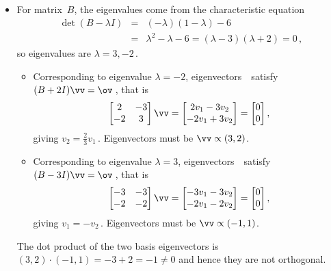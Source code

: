\begin{example}
\begin{solution}
\begin{itemize}
\item For matrix~\(B\), the eigenvalues come from the characteristic equation
\begin{eqnarray*}
\det(B-\lambda I)&=&(-\lambda)(1-\lambda)-6
\\&=&\lambda^2-\lambda-6
=(\lambda-3)(\lambda+2)=0\,,
\end{eqnarray*}
so eigenvalues are \(\lambda=3,-2\)\,.
\begin{itemize}
\item Corresponding to eigenvalue \(\lambda=-2\), eigenvectors~\vv\ satisfy \((B+2I)\vv=\ov\)\,, that is
\begin{equation*}
\begin{bmatrix} 2&-3\\-2&3 \end{bmatrix}\vv
=\begin{bmatrix} 2v_1-3v_2\\-2v_1+3v_2 \end{bmatrix}
=\begin{bmatrix} 0\\0 \end{bmatrix},
\end{equation*}
giving \(v_2=\tfrac23v_1\)\,.  Eigenvectors must be \(\vv\propto(3,2)\).
\item Corresponding to eigenvalue \(\lambda=3\), eigenvectors~\vv\ satisfy \((B-3I)\vv=\ov\)\,, that is
\begin{equation*}
\begin{bmatrix} -3&-3\\-2&-2 \end{bmatrix}\vv
=\begin{bmatrix} -3v_1-3v_2\\-2v_1-2v_2 \end{bmatrix}
=\begin{bmatrix} 0\\0 \end{bmatrix},
\end{equation*}
giving \(v_1=-v_2\)\,.  Eigenvectors must be \(\vv\propto(-1,1)\).
\end{itemize}
The dot product of the two basis eigenvectors is \((3,2)\cdot(-1,1)=-3+2=-1\neq 0\) and hence they are not orthogonal.

\end{itemize}
\end{solution}
\end{example}



